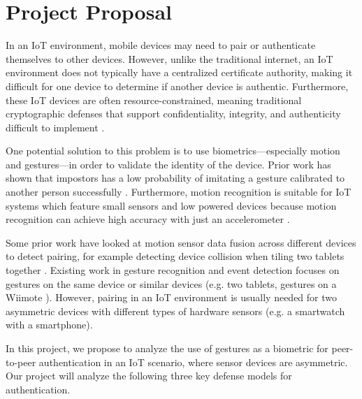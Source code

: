 
\section{Project Proposal}
\label{sec:Proposal}

In an \gls{IoT} environment, mobile devices may need to pair or authenticate themselves to other devices. However, unlike the traditional internet, an \gls{IoT} environment does not typically have a centralized certificate authority, making it difficult for one device to determine if another device is authentic. Furthermore, these \gls{IoT} devices are often resource-constrained, meaning traditional cryptographic defenses that support confidentiality, integrity, and authenticity difficult to implement \cite{cisco:iot-pf,authmodels}.

One potential solution to this problem is to use biometrics---especially motion and gestures---in order to validate the identity of the device. Prior work has shown that impostors has a low probability of imitating a gesture calibrated to another person successfully \cite{Casanova}. Furthermore, motion recognition is suitable for \gls{IoT} systems which feature small sensors and low powered devices because motion recognition can achieve high accuracy with just an accelerometer \cite{RuizeXu}. 

Some prior work have looked at motion sensor data fusion across different devices to detect pairing, for example detecting device collision when tiling two tablets together \cite{SyncGes}. Existing work in gesture recognition and event detection focuses on gestures on the same device or similar devices (e.g. two tablets, gestures on a Wiimote \cite{LiuuWave}). However, pairing in an \gls{IoT} environment is usually needed for two asymmetric devices with different types of hardware sensors (e.g. a smartwatch with a smartphone).

In this project, we propose to analyze the use of gestures as a biometric for peer-to-peer authentication in an \gls{IoT} scenario, where sensor devices are asymmetric. 
Our project will analyze the following three key defense models for authentication.

